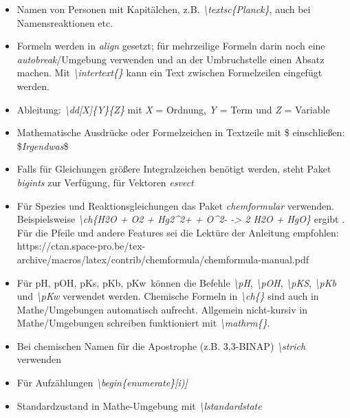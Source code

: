 \documentclass[./main.tex]{subfiles}
\begin{document}
\begin{itemize}
    \item Namen von Personen mit Kapit\"alchen, z.B. \hypertarget{textsc}{\textit{\textbackslash textsc\{Planck\}}}, auch bei Namensreaktionen etc.
    \item Formeln werden in \textit{align} gesetzt; f\"ur mehrzeilige Formeln darin noch eine \textit{autobreak}\-/Umgebung verwenden und an der Umbruchstelle einen Absatz machen. Mit \textit{\hypertarget{intertext}{\textbackslash intertext\{\}}} kann ein Text zwischen Formelzeilen eingef\"ugt werden.  
    \item Ableitung: \textit{\hypertarget{dd}{\textbackslash dd[X]\{Y\}\{Z\}}} mit \textit{X} = Ordnung, \textit{Y} = Term und \textit{Z} = Variable  
    \item Mathematische Ausdr\"ucke oder Formelzeichen in Textzeile mit \$ einschlie\ss{}en:  \$\textit{Irgendwas}\$ 
    \item Falls f\"ur Gleichungen gr\"o\ss{}ere Integralzeichen ben\"otigt werden, steht Paket \textit{bigints} zur Verf\"ugung, f\"ur Vektoren \textit{esvect}
    \item F\"ur Spezies und Reaktionsgleichungen das Paket \textit{chemformular} verwenden. Beispielsweise \textit{\hypertarget{ch}{\textbackslash ch}\{H2O + O2 + Hg2\textasciicircum2+ + O\textasciicircum2- -> 2 H2O + HgO\}} ergibt . F\"ur die Pfeile und andere Features sei die Lekt\"ure der Anleitung empfohlen:  https://ctan.space-pro.be/tex-archive/macros/latex/contrib/chemformula/chemformula-manual.pdf
    \item F\"ur pH, pOH, pKs, pKb, pKw~k\"onnen die Befehle \hypertarget{pH}{} \hypertarget{pKs}{} \hypertarget{pKb}{} \hypertarget{pKw}{} \hypertarget{pOH}{} \textit{\textbackslash pH}, \textit{\textbackslash pOH}, \textit{\textbackslash pKS}, \textit{\textbackslash pKb} und \textit{\textbackslash pKw} verwendet werden. Chemische Formeln in \textit{\textbackslash ch\{\}} sind auch in Mathe\-/Umgebungen automatisch aufrecht. Allgemein nicht-kursiv in Mathe\-/Umgebungen schreiben funktioniert mit \textit{\hypertarget{mathrm}{\textbackslash mathrm\{\}}}. 
    \item Bei chemischen Namen f\"ur die Apostrophe (z.B. 3,3\strich-BINAP) \hypertarget{strich}{\textit{\textbackslash strich}} verwenden
    \item F\"ur Aufz\"ahlungen \hypertarget{beginenumerate}{\textit{\textbackslash begin\{enumerate\}[i)]}}
    \item Standardzustand in Mathe-Umgebung mit \textit{\hypertarget{lstandardstate}{\textbackslash lstandardstate}}

\end{itemize}
\end{document}
